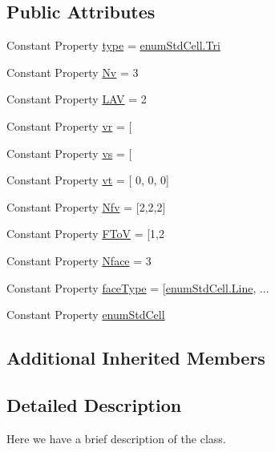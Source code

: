 \subsection*{Public Attributes}
\begin{DoxyCompactItemize}
\item 
Constant Property \hyperlink{class_std_tri_ac93d8dc3c7bd803c9875c47d2c590da7}{type} = \hyperlink{classenum_std_cell_ac4c2fa4e189e76e103f3ff9b1d19b9e7aab74b152bf112943fbdb2b523d4e64fc}{enum\+Std\+Cell.\+Tri}
\item 
Constant Property \hyperlink{class_std_tri_a90eaa989bce63d3c2ef4ba8540ee3150}{Nv} = 3
\item 
Constant Property \hyperlink{class_std_tri_a5359a0550f151126ce8596157727425c}{L\+AV} = 2
\item 
Constant Property \hyperlink{class_std_tri_a3c1d1964951c35a6382d3c68cdb6f232}{vr} = \mbox{[}
\item 
Constant Property \hyperlink{class_std_tri_ab3e529c532c5c3d811348eb178683c39}{vs} = \mbox{[}
\item 
Constant Property \hyperlink{class_std_tri_ad1102edfb9e6cdb68dcbd3228ece1c68}{vt} = \mbox{[} 0, 0, 0\mbox{]}\textquotesingle{}
\item 
Constant Property \hyperlink{class_std_tri_a5b05b49e8a0156b6047a36776c5fafe9}{Nfv} = \mbox{[}2,2,2\mbox{]}
\item 
Constant Property \hyperlink{class_std_tri_afe62c969151bab1b72cd598c8d5def16}{F\+ToV} = \mbox{[}1,2
\item 
Constant Property \hyperlink{class_std_tri_a9088c3233abd0c78b4de8f6f464c8fb2}{Nface} = 3
\item 
Constant Property \hyperlink{class_std_tri_ae49ae76e4b5ce486e7df87634c542e7f}{face\+Type} = \mbox{[}\hyperlink{classenum_std_cell_ac4c2fa4e189e76e103f3ff9b1d19b9e7afd257c7a2b7d6efb3bd9f67c8a36d3cd}{enum\+Std\+Cell.\+Line}, ...
\item 
Constant Property \hyperlink{class_std_tri_a556e371a9d99c027d346c3731a5e0ef0}{enum\+Std\+Cell}
\end{DoxyCompactItemize}
\subsection*{Additional Inherited Members}


\subsection{Detailed Description}
Here we have a brief description of the class. 

